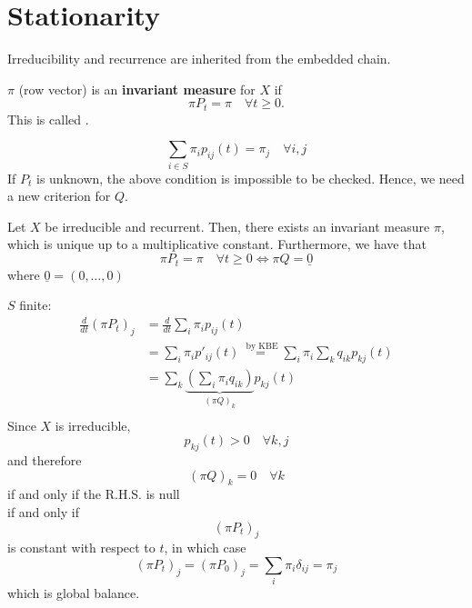 \documentclass{article}
\begin{document}
\section{Stationarity}
Irreducibility and recurrence are inherited from the embedded chain. 
\begin{definition}
	$\pi$ (row vector) is an \textbf{invariant measure} for $X$ if 
	\begin{equation*}
		\pi P_t = \pi \quad \forall t \geq 0.
	\end{equation*}
	This is called .
\end{definition}

\begin{equation*}
	\sum_{i \in S} \pi_i p_{ij}(t) = \pi_j \quad \forall i, j
\end{equation*}
If $P_t$ is unknown, the above condition is impossible to be checked. Hence, we need a new criterion for $Q$. 
\begin{proposition}
		Let $X$ be irreducible and recurrent. Then, there exists an invariant measure $\pi$, which is unique up to a multiplicative constant. Furthermore, we have that 
	\begin{equation*}
		\pi P_t = \pi \quad \forall t \geq  0 \iff \pi Q = \underline{0}
	\end{equation*}
	where $\underline{0} = (0, \ldots,0)$
\end{proposition}
\begin{proof2}
		$S$ finite:
	\begin{align*}
		\frac{d}{dt} (\pi  P_t)_j &= \frac{d}{dt} \sum_i \pi_i p_{ij}(t) \\
		&= \sum_i \pi_i p'_{ij}(t) \stackrel{\text{ by KBE}} =  \sum_i \pi_i \sum_{k} q_{ik} p_{kj}(t) \\
		&= \sum_{k} \underbrace{(\sum_i \pi_i q_{ik})}_{(\pi Q)_k} p_{kj}(t) \\ 
	\end{align*}
	Since $X$ is irreducible, 
	\begin{equation*}
		p_{kj}(t) > 0 \quad \forall k,j
	\end{equation*}
	and therefore
	\begin{equation*}
		(\pi Q)_k = 0 \quad \forall k 
	\end{equation*}
	if and only if the R.H.S. is null \\
	if and only if 
	\begin{equation*}
		(\pi P_t)_j 
	\end{equation*}
	is constant with respect to $t$, in which case 
	\begin{equation*}
		(\pi P_t)_j = (\pi P_0)_j = \sum_i \pi_i \delta_{ij} = \pi_j
	\end{equation*}
	which is global balance.   
\end{proof2}
\end{document}
